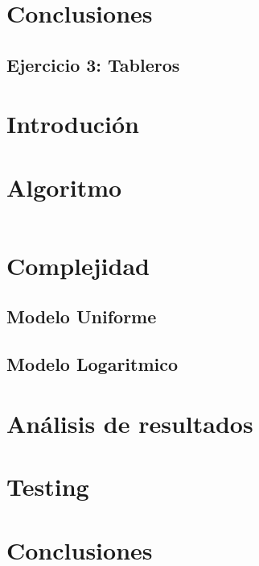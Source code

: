 \documentclass[a4paper, 12pt] {article}
\begin{document}
\section*{Conclusiones}
\newpage

\begin{center}
 \section*{Ejercicio 3: Tableros}
\end{center}

\bigskip
\section*{Introduci\'on}

\section*{Algoritmo}

\begin{verbatim}
\end{verbatim}

\section*{Complejidad}

\subsection*{Modelo Uniforme}

\subsection*{Modelo Logaritmico}

\section*{An\'alisis de resultados}

\section*{Testing}

\begin{comment}
\begin{center}
\includegraphicx[width=0.7\textwidth]{Plots/Ej1-Complejidad.png}
\begin{center}
FiguraX
\end{center}
\end{center}
\end{comment}
\section*{Conclusiones}
\end{document}
